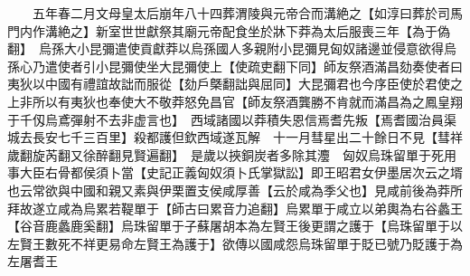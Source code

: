 　　五年春二月文母皇太后崩年八十四葬渭陵與元帝合而溝絶之【如淳曰葬於司馬門内作溝絶之】新室世世獻祭其廟元帝配食坐於牀下莽為太后服喪三年【為于偽翻】　烏孫大小昆彌遣使貢獻莽以烏孫國人多親附小昆彌見匈奴諸邊並侵意欲得烏孫心乃遣使者引小昆彌使坐大昆彌使上【使疏吏翻下同】師友祭酒滿昌劾奏使者曰夷狄以中國有禮誼故詘而服從【劾戶槩翻詘與屈同】大昆彌君也今序臣使於君使之上非所以有夷狄也奉使大不敬莽怒免昌官【師友祭酒龔勝不肯就而滿昌為之鳳皇翔于千仭烏鳶彈射不去非虚言也】　西域諸國以莽積失恩信焉耆先叛【焉耆國治員渠城去長安七千三百里】殺都護但欽西域遂瓦解　十一月彗星出二十餘日不見【彗祥歲翻旋芮翻又徐醉翻見賢遍翻】　是歲以挾銅炭者多除其灋　匈奴烏珠留單于死用事大臣右骨都侯須卜當【史記正義匈奴須卜氏掌獄訟】即王昭君女伊墨居次云之壻也云常欲與中國和親又素與伊栗置支侯咸厚善【云於咸為季父也】見咸前後為莽所拜故遂立咸為烏累若鞮單于【師古曰累音力追翻】烏累單于咸立以弟輿為右谷蠡王【谷音鹿蠡鹿奚翻】烏珠留單于子蘇屠胡本為左賢王後更謂之護于【烏珠留單于以左賢王數死不祥更易命左賢王為護于】欲傳以國咸怨烏珠留單于貶已號乃貶護于為左屠耆王

